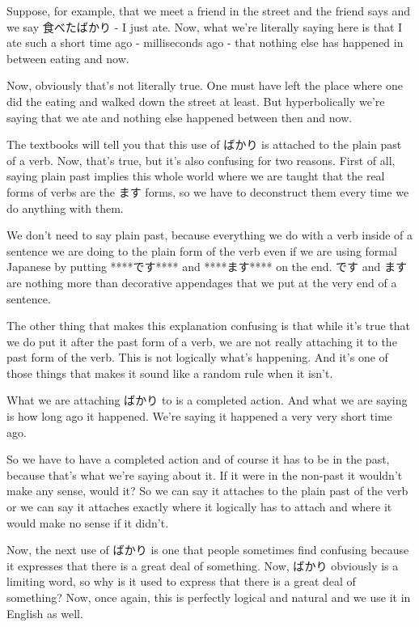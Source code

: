 Suppose, for example, that we meet a friend in the street and the friend says  and we say 食べたばかり - I just ate. Now, what we're literally saying here is that I ate such a short time ago - milliseconds ago - that nothing else has happened in between eating and now.

Now, obviously that's not literally true. One must have left the place where one did the eating and walked down the street at least. But hyperbolically we're saying that we ate and nothing else happened between then and now.

The textbooks will tell you that this use of ばかり is attached to the plain past of a verb. Now, that's true, but it's also confusing for two reasons. First of all, saying plain past implies this whole world where we are taught that the real forms of verbs are the ます forms, so we have to deconstruct them every time we do anything with them.

We don't need to say plain past, because everything we do with a verb inside of a sentence we are doing to the plain form of the verb even if we are using formal Japanese by putting ****です**** and ****ます**** on the end. です and ます are nothing more than decorative appendages that we put at the very end of a sentence.

The other thing that makes this explanation confusing is that while it's true that we do put it after the past form of a verb, we are not really attaching it to the past form of the verb. This is not logically what's happening. And it's one of those things that makes it sound like a random rule when it isn't.

What we are attaching ばかり to is a completed action. And what we are saying is how long ago it happened. We're saying it happened a very very short time ago.

So we have to have a completed action and of course it has to be in the past, because that's what we're saying about it. If it were in the non-past it wouldn't make any sense, would it? So we can say it attaches to the plain past of the verb or we can say it attaches exactly where it logically has to attach and where it would make no sense if it didn't.

Now, the next use of ばかり is one that people sometimes find confusing because it expresses that there is a great deal of something. Now, ばかり obviously is a limiting word, so why is it used to express that there is a great deal of something? Now, once again, this is perfectly logical and natural and we use it in English as well.

